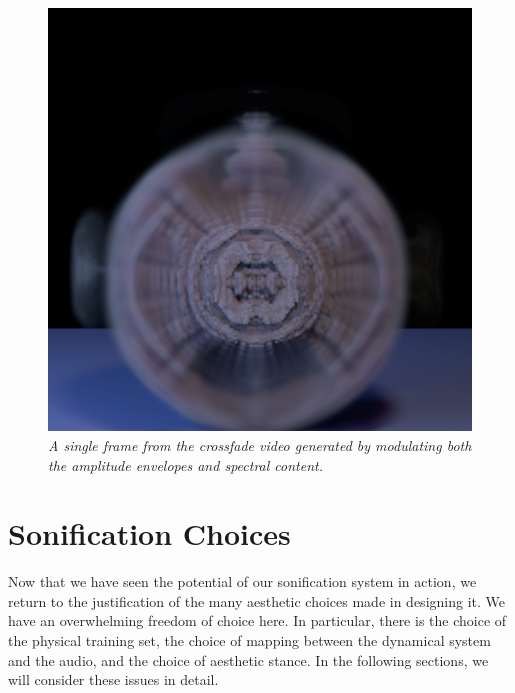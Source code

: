 \begin{figure}[H]
	\centering
	\includegraphics[width=\textwidth]{chap6/figures/cross.png}
	\caption{\em A single frame from the crossfade video generated by modulating both the amplitude envelopes and spectral content.}
\label{fig:cross}
\end{figure}

\section{Sonification Choices}
Now that we have seen the potential of our sonification system in action, we return to the justification of the many aesthetic choices made in designing it. We have an overwhelming freedom of choice here. In particular,  there is the choice of the physical training set, the choice of mapping between the dynamical system and the audio, and the choice of aesthetic stance. In the following sections, we will consider these issues in detail.

